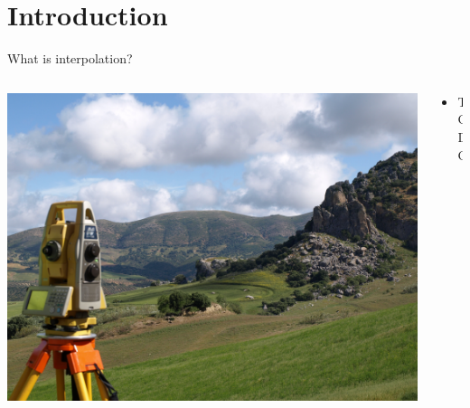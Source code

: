 
\section{Introduction}
\begin{frame}{What is interpolation?}
	\begin{columns}[T] %
		\begin{column}{.48\textwidth}
			\includegraphics[width=\linewidth]{images/background}
		\end{column}%
		\hfill%
		\begin{column}{.56\textwidth}
			\begin{itemize}
				\item TODO
			\end{itemize}
		\end{column}%
	\end{columns}
\end{frame}